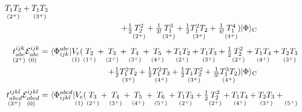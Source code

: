 \documentclass[11pt]{article}
\numberwithin{equation}{section}
\begin{document}
\begin{rmk}
\begin{align}
    \underset{(2^{+})}{\vphantom{(}
      T_1T_2
    }
    +
    \underset{(3^{+})}{\vphantom{(}
      T_1T_3
    }
\\
\label{eq:cc-doubles-equation}
&
\makebox[0.75\linewidth][r]{\ensuremath{
    +
      \tfr{1}{2}
    \underset{(2^{+})}{\vphantom{(}
      T_2^2
    }
    +
      \tfr{1}{3!}
    \underset{(3^{+})}{\vphantom{(}
      T_1^3
    }
    +
      \tfr{1}{2}
    \underset{(3^{+})}{\vphantom{(}
      T_1^2T_2
    }
    +
      \tfr{1}{4!}
    \underset{(4^{+})}{\vphantom{(}
      T_1^4
    }
    )
  \kt{\F}_\mr{C}
}}
\\[3pt]
\nonumber
  \underset{(2^+)}{\vphantom{(}
  t_{abc}^{ijk}
  }
  \underset{(0)}{\vphantom{(}
  \mc{E}_{abc}^{ijk}
  }
=&\
  \br{\F_{ijk}^{abc}}
  \underset{(1)}{\vphantom{(}
    V_\mr{c}
  }
    (
    \underset{(1^{+})}{\vphantom{(}
      T_2
    }
    +
    \underset{(2^{+})}{\vphantom{(}
      T_3
    }
    +
    \underset{(3^{+})}{\vphantom{(}
      T_4
    }
    +
    \underset{(4^{+})}{\vphantom{(}
      T_5
    }
    +
    \underset{(2^{+})}{\vphantom{(}
      T_1T_2
    }
    +
    \underset{(3^{+})}{\vphantom{(}
      T_1T_3
    }
    +
      \tfr{1}{2}
    \underset{(2^{+})}{\vphantom{(}
      T_2^2
    }
    +
    \underset{(4^{+})}{\vphantom{(}
      T_1T_4
    }
    +
    \underset{(3^{+})}{\vphantom{(}
      T_2T_3
    }
\\
\label{eq:cc-triples-equation}
&
\makebox[0.75\linewidth][r]{\ensuremath{
    +
      \tfr{1}{2}
    \underset{(3^{+})}{\vphantom{(}
      T_1^2T_2
    }
    +
      \tfr{1}{2}
    \underset{(4^{+})}{\vphantom{(}
      T_1^2T_3
    }
    +
      \tfr{1}{2}
    \underset{(3^{+})}{\vphantom{(}
      T_1T_2^2
    }
    +
      \tfr{1}{3!}
    \underset{(4^{+})}{\vphantom{(}
      T_1^3T_2
    }
    )
  \kt{\F}_\mr{C}
}}
\\[3pt]
\nonumber
  \underset{(3^+)}{\vphantom{(}
  t_{abcd}^{ijkl}
  }
  \underset{(0)}{\vphantom{(}
  \mc{E}_{abcd}^{ijkl}
  }
=&\
  \br{\F_{ijkl}^{abcd}}
  \underset{(1)}{\vphantom{(}
    V_\mr{c}
  }
    (
    \underset{(2^{+})}{\vphantom{(}
      T_3
    }
    +
    \underset{(3^{+})}{\vphantom{(}
      T_4
    }
    +
    \underset{(4^{+})}{\vphantom{(}
      T_5
    }
    +
    \underset{(5^{+})}{\vphantom{(}
      T_6
    }
    +
    \underset{(2^{+})}{\vphantom{(}
      T_1T_3
    }
    +
      \tfr{1}{2}
    \underset{(2^{+})}{\vphantom{(}
      T_2^2
    }
    +
    \underset{(4^{+})}{\vphantom{(}
      T_1T_4
    }
    +
    \underset{(3^{+})}{\vphantom{(}
      T_2T_3
    }
    +
    \underset{(5^{+})}{\vphantom{(}
}
\end{align}
\end{rmk}
\end{document}
